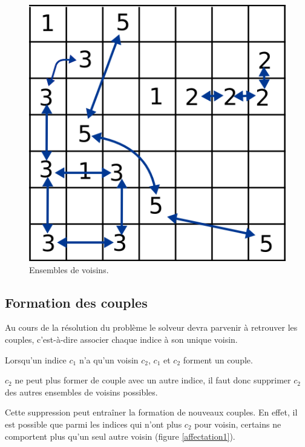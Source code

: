 \begin{figure}[h]
\centering
\includegraphics[scale=0.25]{voisins}
\caption{Ensembles de voisins.}
\end{figure}

\subsection{Formation des couples}

Au cours de la résolution du problème le solveur devra parvenir à retrouver les couples, c'est-à-dire associer chaque indice à son unique voisin.

Lorsqu'un indice $c_1$ n'a qu'un voisin $c_2$, $c_1$ et $c_2$ forment un couple.

$c_2$ ne peut plus former de couple avec un autre indice, il faut donc supprimer $c_2$ des autres ensembles de voisins possibles.

Cette suppression peut entraîner la formation de nouveaux couples. En effet, il est possible que parmi les indices qui n'ont plus $c_2$ pour voisin, certains ne comportent plus qu'un seul autre voisin (figure \ref{affectation1}). 

